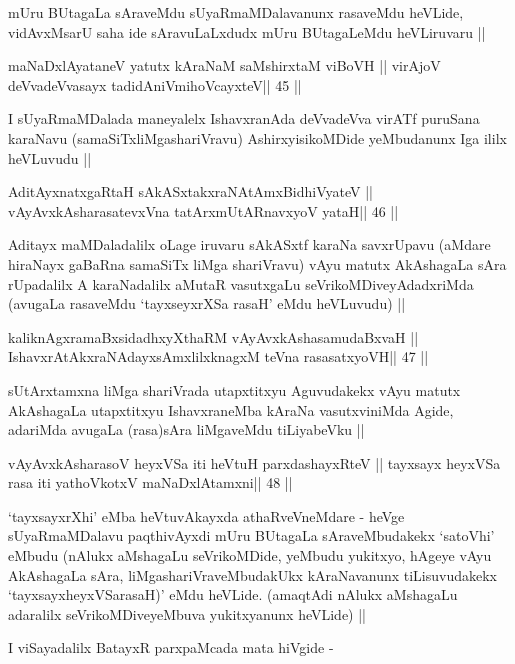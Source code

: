 \begin{artha}
mUru BUtagaLa sAraveMdu sUyaRmaMDalavanunx rasaveMdu heVLide,
vidAvxMsarU saha ide sAravuLaLxdudx mUru BUtagaLeMdu heVLiruvaru ||
\end{artha}

\begin{shl}
maNaDxlAyataneV yatutx kAraNaM saMshirxtaM viBoVH ||
virAjoV deVvadeVvasayx tadidAniVmihoVcayxteV\hfill || 45 ||
\end{shl}

\begin{artha}
I sUyaRmaMDalada maneyalelx IshavxranAda deVvadeVva virATf puruSana
karaNavu (samaSiTxliMgashariVravu) AshirxyisikoMDide yeMbudanunx Iga
ililx heVLuvudu ||
\end{artha}

\begin{shl}
AditAyxnatxgaRtaH sAkASxtakxraNAtAmx\s BidhiVyateV ||
vAyAvxkAsharasatevxVna tatArxmUtARnavxyoV yataH\hfill || 46 ||
\end{shl}

\begin{artha}
Aditayx maMDaladalilx oLage iruvaru sAkASxtf karaNa savxrUpavu (aMdare
hiraNayx gaBaRna samaSiTx liMga shariVravu) vAyu matutx AkAshagaLa
sAra rUpadalilx A karaNadalilx aMutaR vasutxgaLu
seVrikoMDiveyAdadxriMda (avugaLa rasaveMdu `tayxseyxrXSa rasaH' eMdu
heVLuvudu) ||
\end{artha}

\begin{shl}
kaliknAgxramaBxsidadhxyXthaRM vAyAvxkAshasamudaBxvaH ||
IshavxrAtAkxraNAdayxsAmxlilxknagxM teVna rasasatxyoVH\hfill || 47 ||
\end{shl}

\begin{artha}
sUtArxtamxna liMga shariVrada utapxtitxyu Aguvudakekx vAyu matutx
AkAshagaLa utapxtitxyu IshavxraneMba kAraNa vasutxviniMda Agide,
adariMda avugaLa (rasa)sAra liMgaveMdu tiLiyabeVku ||
\end{artha}

\begin{shl}
vAyAvxkAsharasoV heyxVSa iti heVtuH parxdashayxRteV ||
tayxsayx heyxVSa rasa iti yathoVkotxV maNaDxlAtamxni\hfill || 48 ||
\end{shl}

\begin{artha}
`tayxsayxrXhi' eMba heVtuvAkayxda athaRveVneMdare - heVge
sUyaRmaMDalavu paqthivAyxdi mUru BUtagaLa sAraveMbudakekx `satoVhi'
eMbudu (nAlukx aMshagaLu seVrikoMDide, yeMbudu yukitxyo, hAgeye vAyu
AkAshagaLa sAra, liMgashariVraveMbudakUkx kAraNavanunx tiLisuvudakekx
`tayxsayxheyxVSarasaH)' eMdu heVLide. (amaqtAdi nAlukx aMshagaLu
adaralilx seVrikoMDiveyeMbuva yukitxyanunx heVLide) ||

I viSayadalilx BatayxR parxpaMcada mata hiVgide -
\end{artha}

